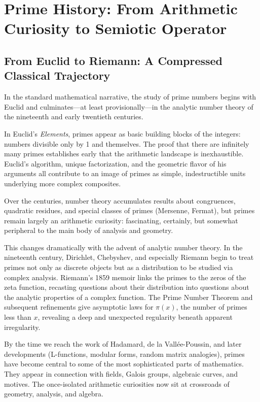 \documentclass[12]{amsart}
\theoremstyle{plain}
\begin{document}
\section{Prime History: From Arithmetic Curiosity to Semiotic Operator}

\subsection{From Euclid to Riemann: A Compressed Classical Trajectory}

In the standard mathematical narrative, the study of prime numbers begins with Euclid and culminates—at least provisionally—in the analytic number theory of the nineteenth and early twentieth centuries.

In Euclid's \emph{Elements}, primes appear as basic building blocks of the integers: numbers divisible only by 1 and themselves. The proof that there are infinitely many primes establishes early that the arithmetic landscape is inexhaustible. Euclid's algorithm, unique factorization, and the geometric flavor of his arguments all contribute to an image of primes as simple, indestructible units underlying more complex composites.

Over the centuries, number theory accumulates results about congruences, quadratic residues, and special classes of primes (Mersenne, Fermat), but primes remain largely an arithmetic curiosity: fascinating, certainly, but somewhat peripheral to the main body of analysis and geometry.

This changes dramatically with the advent of analytic number theory. In the nineteenth century, Dirichlet, Chebyshev, and especially Riemann begin to treat primes not only as discrete objects but as a distribution to be studied via complex analysis. Riemann's 1859 memoir links the primes to the zeros of the zeta function, recasting questions about their distribution into questions about the analytic properties of a complex function. The Prime Number Theorem and subsequent refinements give asymptotic laws for $\pi(x)$, the number of primes less than $x$, revealing a deep and unexpected regularity beneath apparent irregularity.

By the time we reach the work of Hadamard, de la Vallée-Poussin, and later developments (L-functions, modular forms, random matrix analogies), primes have become central to some of the most sophisticated parts of mathematics. They appear in connection with fields, Galois groups, algebraic curves, and motives. The once-isolated arithmetic curiosities now sit at crossroads of geometry, analysis, and algebra.
\end{document}
